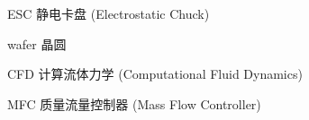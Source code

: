 \begin{denotation}

\item[ESC] 静电卡盘 (Electrostatic Chuck)
\item[wafer] 晶圆
\item[CFD] 计算流体力学 (Computational Fluid Dynamics)
\item[MFC] 质量流量控制器 (Mass Flow Controller)


\end{denotation}
